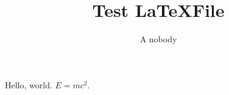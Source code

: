 \documentclass[a4paper]{article}
\title{Test \LaTeX File}
\author{A nobody}
\begin{document}
\maketitle
Hello, world. $E=mc^2$.
\lipsum[1-50]
\end{document}
